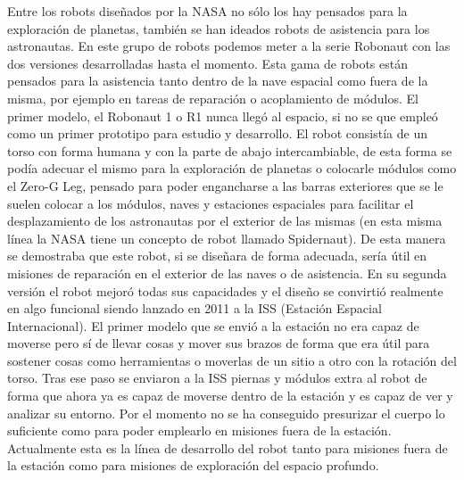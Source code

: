 Entre los robots diseñados por la NASA no sólo los hay pensados para la exploración de planetas, también se han ideados robots de asistencia para los astronautas. En este grupo de robots podemos meter a la serie Robonaut con las dos versiones desarrolladas hasta el momento. Esta gama de robots están pensados para la asistencia tanto dentro de la nave espacial como fuera de la misma, por ejemplo en tareas de reparación o acoplamiento de módulos. El primer modelo, el Robonaut 1 o R1 nunca llegó al espacio, si no se que empleó como un primer prototipo para estudio y desarrollo. El robot consistía de un torso con forma humana y con la parte de abajo intercambiable, de esta forma se podía adecuar el mismo para la exploración de planetas o colocarle módulos como el Zero-G Leg, pensado para poder engancharse a las barras exteriores que se le suelen colocar a los módulos, naves y estaciones espaciales para facilitar el desplazamiento de los astronautas por el exterior de las mismas (en esta misma línea la NASA tiene un concepto de robot llamado Spidernaut). De esta manera se demostraba que este robot, si se diseñara de forma adecuada, sería útil en misiones de reparación en el exterior de las naves o de asistencia. En su segunda versión el robot mejoró todas sus capacidades y el diseño se convirtió realmente en algo funcional siendo lanzado en 2011 a la ISS (Estación Espacial Internacional). El primer modelo que se envió a la estación no era capaz de moverse pero sí de llevar cosas y mover sus brazos de forma que era útil para sostener cosas como herramientas o moverlas de un sitio a otro con la rotación del torso. Tras ese paso se enviaron a la ISS piernas y módulos extra al robot de forma que ahora ya es capaz de moverse dentro de la estación y es capaz de ver y analizar su entorno. Por el momento no se ha conseguido presurizar el cuerpo lo suficiente como para poder emplearlo en misiones fuera de la estación. Actualmente esta es la línea de desarrollo del robot tanto para misiones fuera de la estación como para misiones de exploración del espacio profundo.

